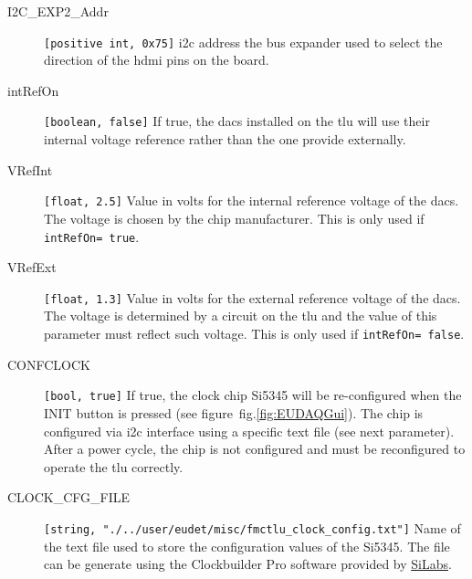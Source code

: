 \begin{description}
  \item[I2C\_EXP2\_Addr] \verb|[positive int, 0x75]| \gls{i2c} address the bus expander used to select the direction of the \gls{hdmi} pins on the board.
  \item[intRefOn] \verb|[boolean, false]| If true, the \gls{dac}s installed on the \gls{tlu} will use their internal voltage reference rather than the one provide externally.
  \item[VRefInt] \verb|[float, 2.5]| Value in volts for the internal reference voltage of the \gls{dac}s. The voltage is chosen by the chip manufacturer. This is only used if \verb|intRefOn= true|.
  \item[VRefExt] \verb|[float, 1.3]| Value in volts for the external reference voltage of the \gls{dac}s. The voltage is determined by a circuit on the \gls{tlu} and the value of this parameter must reflect such voltage. This is only used if \verb|intRefOn= false|.
  \item[CONFCLOCK] \verb|[bool, true]| If true, the clock chip Si5345 will be re-configured when the INIT button is pressed (see figure~fig.\ref{fig:EUDAQGui}). The chip is configured via \gls{i2c} interface using a specific text file (see next parameter). After a power cycle, the chip is not configured and must be reconfigured to operate the \gls{tlu} correctly.
  \item[CLOCK\_CFG\_FILE] \verb|[string, "./../user/eudet/misc/fmctlu_clock_config.txt"]| Name of the text file used to store the configuration values of the Si5345. The file can be generate using the Clockbuilder Pro software provided by \href{https://www.silabs.com/products/development-tools/software/clock}{SiLabs}.
\end{description}

